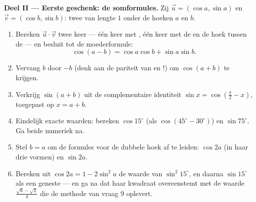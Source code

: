 \begin{problem}
\medskip
\noindent\textbf{Deel II --- Eerste geschenk: de somformules.}
Zij $\vec u = (\cos a, \sin a)$ en $\vec v = (\cos b, \sin b)$: twee 
van lengte $1$ onder de hoeken $a$ en $b$.
\begin{enumerate}[resume]
  \item Bereken $\vec u \cdot \vec v$ twee keer --- één keer met ,
        één keer met de  en de hoek tussen de  --- en besluit
        tot de moederformule:
        \[
        \cos(a - b) = \cos a \cos b + \sin a \sin b .
        \]
  \item Vervang $b$ door $-b$ (denk aan de pariteit van  en !) om
        $\cos(a + b)$ te krijgen.
  \item Verkrijg $\sin(a + b)$ uit de complementaire identiteit
        $\sin x = \cos\left(\frac\pi2 - x\right)$, toegepast op $x = a + b$.
  \item Eindelijk exacte waarden: bereken $\cos 15^\circ$ (als
        $\cos(45^\circ - 30^\circ)$) en $\sin 75^\circ$. Ga beide numeriek
        na.
  \item Stel $b = a$ om de formules voor de dubbele hoek af te leiden:
        $\cos 2a$ (in haar drie vormen) en $\sin 2a$.
  \item Bereken uit $\cos 2a = 1 - 2\sin^2 a$ de waarde van
        $\sin^2 15^\circ$, en daarna $\sin 15^\circ$ als een geneste 
        --- en ga na dat haar kwadraat overeenstemt met de waarde
        $\frac{\sqrt6 - \sqrt2}{4}$ die de methode van vraag 9 oplevert.
\end{enumerate}


\end{problem}
